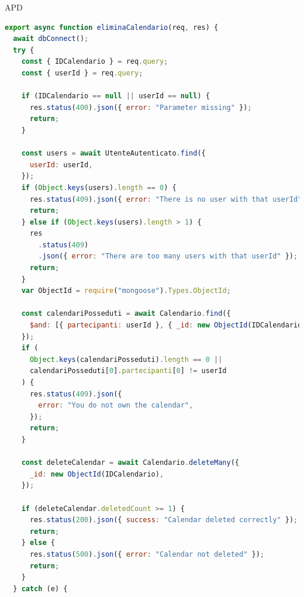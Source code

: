 \begin{listaPersonale} {APD}
\begin{listaPersonale2}[APD]{}

                \begin{lstlisting}[language=JavaScript]
export async function eliminaCalendario(req, res) {
  await dbConnect();
  try {
    const { IDCalendario } = req.query;
    const { userId } = req.query;

    if (IDCalendario == null || userId == null) {
      res.status(400).json({ error: "Parameter missing" });
      return;
    }

    const users = await UtenteAutenticato.find({
      userId: userId,
    });
    if (Object.keys(users).length == 0) {
      res.status(409).json({ error: "There is no user with that userId" });
      return;
    } else if (Object.keys(users).length > 1) {
      res
        .status(409)
        .json({ error: "There are too many users with that userId" });
      return;
    }
    var ObjectId = require("mongoose").Types.ObjectId;

    const calendariPosseduti = await Calendario.find({
      $and: [{ partecipanti: userId }, { _id: new ObjectId(IDCalendario) }],
    });
    if (
      Object.keys(calendariPosseduti).length == 0 ||
      calendariPosseduti[0].partecipanti[0] != userId
    ) {
      res.status(409).json({
        error: "You do not own the calendar",
      });
      return;
    }

    const deleteCalendar = await Calendario.deleteMany({
      _id: new ObjectId(IDCalendario),
    });

    if (deleteCalendar.deletedCount >= 1) {
      res.status(200).json({ success: "Calendar deleted correctly" });
      return;
    } else {
      res.status(500).json({ error: "Calendar not deleted" });
      return;
    }
  } catch (e) {
    

\end{lstlisting}
\end{listaPersonale2}
\end{listaPersonale}
